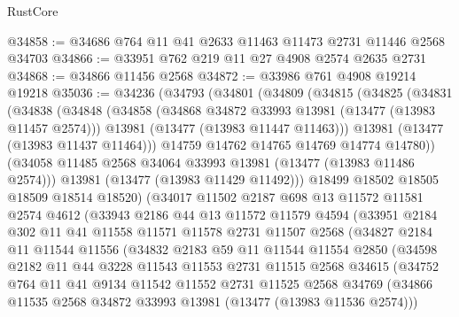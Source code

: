 \begin{lexlean}{RustCore}
\begin{coremodule}
@34858 := @34686 @764 @11 @41 @2633 @11463 @11473 @2731 @11446 @2568 @34703
@34866 := @33951 @762 @219 @11 @27 @4908 @2574 @2635 @2731
@34868 := @34866 @11456 @2568
@34872 := @33986 @761 @4908 @19214 @19218
@35036 := @34236
    (@34793
      (@34801
        (@34809
          (@34815
            (@34825
              (@34831
                (@34838
                  (@34848
                    (@34858
                      (@34868 @34872 @33993 @13981 (@13477 (@13983 @11457 @2574)))
                      @13981
                      (@13477 (@13983 @11447 @11463)))
                    @13981
                    (@13477 (@13983 @11437 @11464)))
                  @14759
                  @14762
                  @14765
                  @14769
                  @14774
                  @14780))
              (@34058 @11485 @2568 @34064 @33993 @13981 (@13477 (@13983 @11486 @2574)))
              @13981
              (@13477 (@13983 @11429 @11492)))
            @18499
            @18502
            @18505
            @18509
            @18514
            @18520)
          (@34017
            @11502
            @2187
            @698
            @13
            @11572
            @11581
            @2574
            @4612
            (@33943
              @2186
              @44
              @13
              @11572
              @11579
              @4594
              (@33951
                @2184
                @302
                @11
                @41
                @11558
                @11571
                @11578
                @2731
                @11507
                @2568
                (@34827
                  @2184
                  @11
                  @11544
                  @11556
                  (@34832
                    @2183
                    @59
                    @11
                    @11544
                    @11554
                    @2850
                    (@34598
                      @2182
                      @11
                      @44
                      @3228
                      @11543
                      @11553
                      @2731
                      @11515
                      @2568
                      @34615
                      (@34752
                        @764
                        @11
                        @41
                        @9134
                        @11542
                        @11552
                        @2731
                        @11525
                        @2568
                        @34769
                        (@34866 @11535 @2568 @34872 @33993 @13981 (@13477 (@13983 @11536 @2574)))

\end{coremodule}
\end{lexlean}
